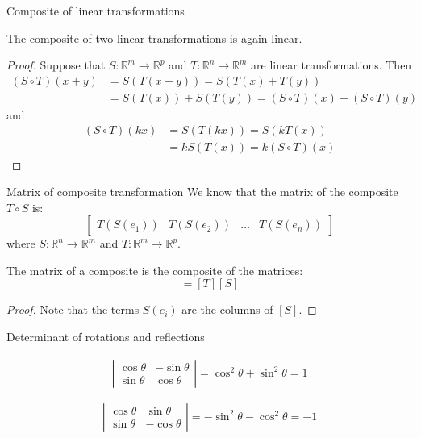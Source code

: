 \documentclass{beamer}
\begin{document}
\begin{frame}{Composite of linear transformations}
\begin{example}
The composite of two linear transformations is again linear.
\begin{proof}
Suppose that $S:\mathbb{R}^m \rightarrow \mathbb{R}^p$ and $T:\mathbb{R}^n \rightarrow \mathbb{R}^m$ are linear transformations. Then
\begin{align*}
(S\circ T)(x+y) &= S(T(x+y)) = S(T(x)+T(y)) \\
&= S(T(x)) + S(T(y)) = (S\circ T)(x) + (S\circ T)(y)
\end{align*}
and
\begin{align*}
(S\circ T)(kx) &= S(T(kx)) = S(kT(x))\\
&= kS(T(x)) = k(S\circ T)(x)
\end{align*}
\end{proof}
\end{example}
\end{frame}

\begin{frame}{Matrix of composite transformation}
We know that the matrix of the composite $T\circ S$ is:
\begin{equation*}
\left[
\begin{array}{cccc}
T(S(e_1)) & T(S(e_2)) & \dots & T(S(e_n))
\end{array}
\right]
\end{equation*}
where $S: \mathbb{R}^n \rightarrow \mathbb{R}^m$ and $T: \mathbb{R}^m \rightarrow \mathbb{R}^p$.\vfill
\begin{theorem}
The matrix of a composite is the composite of the matrices:
\begin{equation*}
[T\circ S] = [T][S]
\end{equation*}
\begin{proof}
Note that the terms $S(e_i)$ are the columns of $[S]$.
\end{proof}
\end{theorem}

\end{frame}

\begin{frame}{Determinant of rotations and reflections}
\begin{example}
\begin{align*}
\left|
\begin{array}{cc}
\cos\theta & -\sin\theta\\
\sin\theta & \cos\theta
\end{array}
\right| = \cos^2\theta + \sin^2\theta = 1
\end{align*}
\end{example}
\begin{example}
\[\left|
\begin{array}{cc}
\cos\theta & \sin\theta\\
\sin\theta & -\cos\theta
\end{array}
\right|  = -\sin^2\theta -\cos^2\theta = -1
\]
\end{example}
\end{frame}
\end{document}

